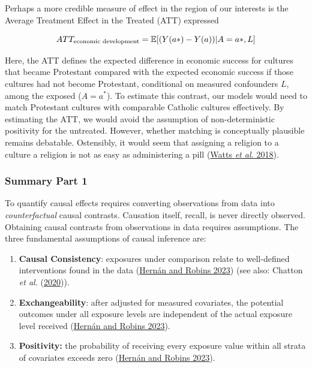 \documentclass[
  singlecolumn]{article}
\begin{document}
Perhaps a more credible measure of effect in the region of our interests
is the Average Treatment Effect in the Treated (ATT) expressed

\[ATT_{\textnormal{economic~development}} = \mathbb{E}[(Y(a*)- Y(a))|A = a*,L]\]

Here, the ATT defines the expected difference in economic success for
cultures that became Protestant compared with the expected economic
success if those cultures had not become Protestant, conditional on
measured confounders \(L\), among the exposed (\(A = a^*\)). To estimate
this contrast, our models would need to match Protestant cultures with
comparable Catholic cultures effectively. By estimating the ATT, we
would avoid the assumption of non-deterministic positivity for the
untreated. However, whether matching is conceptually plausible remains
debatable. Ostensibly, it would seem that assigning a religion to a
culture a religion is not as easy as administering a pill
(\protect\hyperlink{ref-watts2018}{Watts \emph{et al.} 2018}).

\hypertarget{summary-part-1}{%
\subsubsection{Summary Part 1}\label{summary-part-1}}

To quantify causal effects requires converting observations from data
into \emph{counterfactual} causal contrasts. Causation itself, recall,
is never directly observed. Obtaining causal contrasts from observations
in data requires assumptions. The three fundamental assumptions of
causal inference are:

\begin{enumerate}
\def\labelenumi{\arabic{enumi}.}
\item
  \textbf{Causal Consistency}: exposures under comparison relate to
  well-defined interventions found in the data
  (\protect\hyperlink{ref-hernuxe1n2023}{Hernán and Robins 2023}) (see
  also: Chatton \emph{et al.}
  (\protect\hyperlink{ref-chatton2020}{2020})).
\item
  \textbf{Exchangeability}: after adjusted for measured covariates, the
  potential outcomes under all exposure levels are independent of the
  actual exposure level received
  (\protect\hyperlink{ref-hernuxe1n2023}{Hernán and Robins 2023}).
\item
  \textbf{Positivity:} the probability of receiving every exposure value
  within all strata of covariates exceeds zero
  (\protect\hyperlink{ref-hernuxe1n2023}{Hernán and Robins 2023}).
\end{enumerate}
\end{document}

